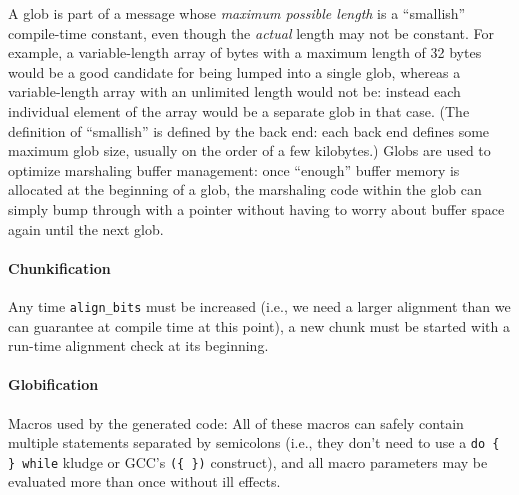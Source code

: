 A glob is part of a message whose \emph{maximum possible length} is a
``smallish'' compile-time constant, even though the \emph{actual} length may
not be constant.  For example, a variable-length array of bytes with a maximum
length of 32 bytes would be a good candidate for being lumped into a single
glob, whereas a variable-length array with an unlimited length would not be:
instead each individual element of the array would be a separate glob in that
case.  (The definition of ``smallish'' is defined by the back end: each back
end defines some maximum glob size, usually on the order of a few kilobytes.)
Globs are used to optimize marshaling buffer management: once ``enough'' buffer
memory is allocated at the beginning of a glob, the marshaling code within the
glob can simply bump through with a pointer without having to worry about
buffer space again until the next glob.

\paragraph{Chunkification}  %

Any time \texttt{align\_bits} must be increased (i.e., we need a larger
alignment than we can guarantee at compile time at this point), a new chunk
must be started with a run-time alignment check at its beginning.

\paragraph{Globification} %

Macros used by the generated code: All of these macros can safely contain
multiple statements separated by semicolons (i.e., they don't need to use a
\texttt{do \{ \} while} kludge or GCC's \texttt{(\{ \})} construct), and all
macro parameters may be evaluated more than once without ill effects.

